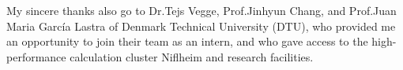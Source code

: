 My sincere thanks also go to Dr.Tejs Vegge, Prof.Jinhyun Chang, and Prof.Juan Maria García Lastra of Denmark Technical University (DTU), who provided me an opportunity to join their team as an intern, and who gave access to the high-performance calculation cluster Niflheim and research facilities. 

